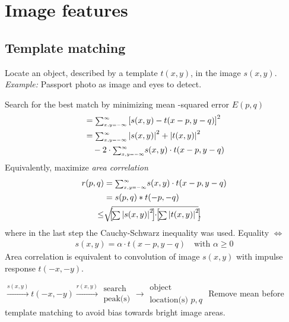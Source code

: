 \chapter{Image features}
\section{Template matching}
\begin{compactdesc}
	\item[\lp{Problem}] Locate an object, described by a template $t(x,y)$, in the image $s(x,y)$. \emph{Example:} Passport photo as image and eyes to detect.
	\item[\lp{Method}] Search for the best match by minimizing mean -squared error $E(p,q)$
		\begin{align*}
			&={\scriptstyle\sum_{x,y=-\infty}^{\infty}}\left[ s(x,y)-t(x-p,y-q) \right]^2\\
			&={\scriptstyle\sum_{x,y=-\infty}^{\infty}}\left\lvert s(x,y) \right\rvert^2+\left\lvert t(x,y) \right\rvert^2\\
			&\quad -2\cdot{\scriptstyle\sum_{x,y=-\infty}^{\infty}}s(x,y)\cdot t(x-p,y-q)
		\end{align*}
		Equivalently, maximize \emph{area correlation}
		\begin{align*}
			r(p,q)&={\scriptstyle\sum_{x,y=-\infty}^{\infty}}s(x,y)\cdot t(x-p,y-q)\\
			&=s(p,q)*t(-p,-q)\\
			\!\!\!\!\leq&\sqrt{\!\!\left[\! {\scriptstyle\sum} \abs{s(x,y)}^2 \!\right]\!\!\cdot\!\!\left[\! {\scriptstyle\sum} \abs{t(x,y)}^2 \!\right]\!\!},
		\end{align*}
		where in the last step the Cauchy-Schwarz inequality was used. Equality $\Leftrightarrow$
		\begin{gather*}
			s(x,y)=\alpha\cdot t(x-p,y-q)\quad \text{with }\alpha\geq0
		\end{gather*}
		Area correlation is equivalent to convolution of image $s(x,y)$ with impulse response $t(-x,-y)$. 
	\item[\lp{Diagram of template matcher}] $\xrightarrow{s(x,y)}t(-x,-y)\xrightarrow{r(x,y)}\displaystyle
		\begin{matrix}
			\text{search}\\
			\text{peak(s)}
		\end{matrix}
		\to
		\begin{matrix}
			\text{object}\\
			\text{location(s) }p,q
		\end{matrix}
		$ Remove mean before template matching to avoid bias towards bright image areas.
\end{compactdesc}
